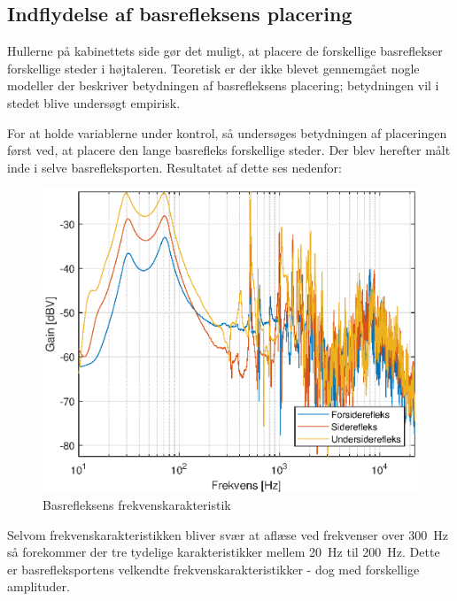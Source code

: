 \newpage
\subsection{Indflydelse af basrefleksens placering}
Hullerne på kabinettets side gør det muligt, at placere de forskellige basreflekser forskellige steder i højtaleren. Teoretisk er der ikke blevet gennemgået nogle modeller der beskriver betydningen af basrefleksens placering; betydningen vil i stedet blive undersøgt empirisk.

For at holde variablerne under kontrol, så undersøges betydningen af placeringen først ved, at placere den lange basrefleks forskellige steder. Der blev herefter målt inde i selve basrefleksporten. Resultatet af dette ses nedenfor:
\begin{figure}[H]
	\centering
	\vspace{-12pt}
	\includegraphics[width=\textwidth]{Pics/BassReflexPlacementLongReflex}
	\caption{Basrefleksens frekvenskarakteristik}
\end{figure}

Selvom frekvenskarakteristikken bliver svær at aflæse ved frekvenser over \SI{300}{\hertz} så forekommer der tre tydelige karakteristikker mellem \SI{20}{\hertz} til \SI{200}{\hertz}. Dette er basrefleksportens velkendte frekvenskarakteristikker - dog med forskellige amplituder.